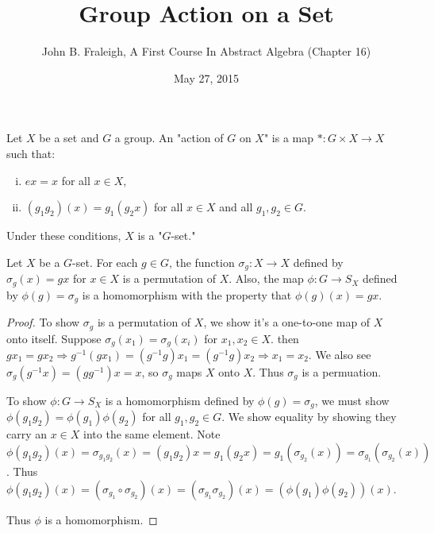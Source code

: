 \documentclass[a4paper,11pt]{article}
\title{Group Action on a Set}
\author{John B. Fraleigh, A First Course In Abstract Algebra (Chapter 16)}
\date{May 27, 2015}
\begin{document}
\maketitle
{}
\setlength\parindent{24pt}

\begin{outline}

    Let \(X\) be a set and \(G\) a group. An "action of \(G\) on \(X\)" is a map 
    \(*: G \times X \rightarrow X\) such that:
    \begin{enumerate}[i.]
      \item \(ex = x\) for all \(x \in X\),
      \item \((g_{1}g_{2})(x) = g_{1}(g_{2}x)\) for all \(x \in X\) and all \(g_{1}, g_{2} \in G\).
    \end{enumerate}
    Under these conditions, \(X\) is a "\(G\)-set."

    Let \(X\) be a \(G\)-set. For each \(g \in G\), the function \(\sigma_{g}: X \rightarrow X\)
    defined by \(\sigma_{g}(x) = gx\) for \(x \in X\) is a permutation of \(X\). Also, the map 
    \(\phi: G \rightarrow S_{X}\) defined by \(\phi(g) = \sigma_{g}\) is a homomorphism with the 
    property that \(\phi(g)(x) = gx\).
    
    \begin{proof}
      To show \(\sigma_{g}\) is a permutation of \(X\), we show it's a one-to-one map of \(X\) onto itself. Suppose
      \(\sigma_{g}(x_{1}) = \sigma_{g}(x_{i})\) for \(x_{1}, x_{2} \in X\). then \(gx_{1} = gx_{2} \Rightarrow 
      g^{-1}(gx_{1}) = (g^{-1}g)x_{1} = (g^{-1}g)x_{2} \Rightarrow x_{1} = x_{2}\). We also see \(\sigma_{g}(g^{-1}x) =
      (gg^{-1})x = x\), so \(\sigma_{g}\) maps \(X\) onto \(X\). Thus \(\sigma_{g}\) is a permuation.
      
      To show \(\phi: G \rightarrow S_{X}\) is a homomorphism defined by \(\phi(g) = \sigma_{g}\), we must show 
      \(\phi(g_{1}g_{2}) = \phi(g_{1})\phi(g_2)\) for all \(g_1, g_2 \in G\). We show equality by showing they carry an
      \(x \in X\) into the same element. Note \(\phi(g_1g_2)(x) = \sigma_{g_1g_2}(x) = (g_1g_2)x = g_1(g_2x) 
      = g_1(\sigma_{g_2}(x)) = \sigma_{g_1}(\sigma_{g_2}(x))\). Thus \(\phi(g_1g_2)(x) = 
      (\sigma_{g_1} \circ \sigma_{g_2})(x) = (\sigma_{g_1}\sigma_{g_2})(x) = (\phi(g_1)\phi(g_2))(x)\). 
      
      Thus \(\phi\) is a homomorphism.
    \end{proof}


\end{outline}
\end{document}
